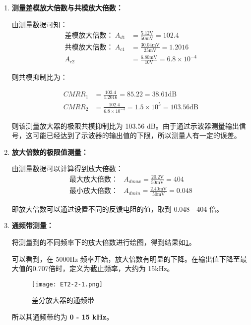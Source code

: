 	\begin{enumerate}
		\item \textbf{测量差模放大倍数与共模放大倍数：}

			由测量数据可知：
			\begin{align*}
				\text{差模放大倍数：} \ A_{d1} &= \frac{5.12 \text{V}}{50 \text{mV}} = 102.4	\nonumber \\
				\text{共模放大倍数：} \ A_{c1} &= \frac{30.04 \text{mV}}{25 \text{mV}} = 1.2016 \nonumber	\\
				A_{c2} &= \frac{6.80 \text{mV}}{10 \text{V}} = 6.8 \times 10^{-4}	\nonumber
			\end{align*}

			则共模抑制比为：

			\begin{align*}
				CMRR_1 &= \frac{102.4}{1.2016} = 85.22 = 38.61 \text{dB}	\\
				CMRR_2 &= \frac{102.4}{6.8 \times 10^{-4}} = 1.5 \times 10^{5} = 103.56 \text{dB}
			\end{align*}

			则该测量放大器的极限共模抑制比为 103.56 dB。由于通过示波器测量输出信号，这可能已经达到了示波器的输出值的下限，所以测量人有一定的误差。


		\item \textbf{放大倍数的极限值测量：}
			
			由测量数据可以计算得到放大倍数：
			\begin{align*}
				\text{最大放大倍数：}	&A_{dmax} = \frac{20.2 \text{V}}{50 \text{mV}} = 404	\\
				\text{最小放大倍数：}	&A_{dmin} = \frac{2.40 \text{mV}}{50 \text{mV}} = 0.048
			\end{align*}

			即放大倍数可以通过设置不同的反馈电阻的值，取到 0.048 - 404 倍。
		
			
		\item \textbf{通频带测量：}
		
			将测量到的不同频率下的放大倍数进行绘图，得到结果如\cref{fig:ET2-2-1}。

			可以看到，在 5000Hz 频率开始，放大倍数有明显的下降。在输出值下降至最大值的0.707倍时，定义为截止频率，大约为 15kHz。

			\begin{figure}[htbp]
				\centering
				\texttt{[image: ET2-2-1.png]}
				\caption{差分放大器的通频带}
				\label{fig:ET2-2-1}
			\end{figure}
		
			所以其通频带约为 \textbf{0 - 15 kHz}。

	\end{enumerate}

